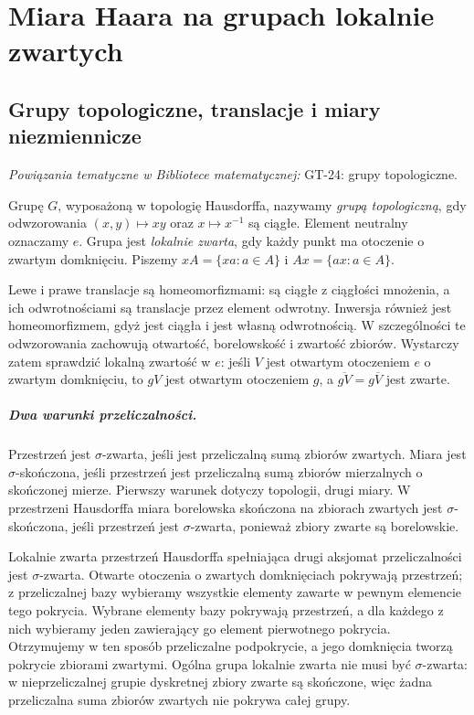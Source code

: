 \chapter{Miara Haara na grupach lokalnie zwartych}
\label{ch:haar-23}

\providecommand{\atlasref}[2]{#2}


\section{Grupy topologiczne, translacje i miary niezmiennicze}

\noindent\emph{Powiązania tematyczne w Bibliotece matematycznej:} \atlasref{GT-24::def:topog24-group}{GT-24: grupy topologiczne}.

\begin{definicja}
\label{def:topological-group-23}
Grupę $G$, wyposażoną w topologię Hausdorffa, nazywamy
\emph{grupą topologiczną}, gdy odwzorowania $(x,y)\mapsto xy$
oraz $x\mapsto x^{-1}$ są ciągłe. Element neutralny oznaczamy $e$.
Grupa jest \emph{lokalnie zwarta}, gdy każdy punkt ma otoczenie
o zwartym domknięciu. Piszemy $xA=\{xa:a\in A\}$
i $Ax=\{ax:a\in A\}$.
\end{definicja}
Lewe i prawe translacje są homeomorfizmami: są ciągłe
z ciągłości mnożenia, a ich odwrotnościami są translacje
przez element odwrotny. Inwersja również jest homeomorfizmem,
gdyż jest ciągła i jest własną odwrotnością. W szczególności
te odwzorowania zachowują otwartość, borelowskość
i zwartość zbiorów. Wystarczy zatem sprawdzić lokalną
zwartość w $e$: jeśli $V$ jest otwartym otoczeniem $e$
o zwartym domknięciu, to $gV$ jest otwartym otoczeniem
$g$, a $\overline{gV}=g\overline V$ jest zwarte.

\paragraph{Dwa warunki przeliczalności.}
Przestrzeń jest $\sigma$-zwarta, jeśli jest przeliczalną
sumą zbiorów zwartych. Miara jest $\sigma$-skończona,
jeśli przestrzeń jest przeliczalną sumą zbiorów
mierzalnych o skończonej mierze. Pierwszy warunek
dotyczy topologii, drugi miary. W przestrzeni
Hausdorffa miara borelowska skończona na zbiorach
zwartych jest $\sigma$-skończona, jeśli przestrzeń
jest $\sigma$-zwarta, ponieważ zbiory zwarte są
borelowskie.

Lokalnie zwarta przestrzeń Hausdorffa spełniająca
drugi aksjomat przeliczalności jest $\sigma$-zwarta.
Otwarte otoczenia o zwartych domknięciach pokrywają
przestrzeń; z przeliczalnej bazy wybieramy wszystkie
elementy zawarte w pewnym elemencie tego pokrycia.
Wybrane elementy bazy pokrywają przestrzeń, a dla
każdego z nich wybieramy jeden zawierający go element
pierwotnego pokrycia. Otrzymujemy w ten sposób
przeliczalne podpokrycie, a jego domknięcia tworzą
pokrycie zbiorami zwartymi. Ogólna grupa lokalnie
zwarta nie musi być $\sigma$-zwarta: w nieprzeliczalnej
grupie dyskretnej zbiory zwarte są skończone, więc
żadna przeliczalna suma zbiorów zwartych nie pokrywa
całej grupy.

